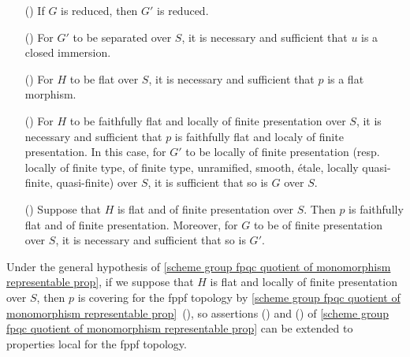 \begin{proposition}
\begin{enumerate}
    \item[(\rmnum{9})] If $G$ is reduced, then $G'$ is reduced.
    \item[(\rmnum{10})] For $G'$ to be separated over $S$, it is necessary and sufficient that $u$ is a closed immersion.
    \item[(\rmnum{11})] For $H$ to be flat over $S$, it is necessary and sufficient that $p$ is a flat morphism.
    \item[(\rmnum{12})] For $H$ to be faithfully flat and locally of finite presentation over $S$, it is necessary and sufficient that $p$ is faithfully flat and localy of finite presentation. In this case, for $G'$ to be locally of finite presentation (resp. locally of finite type, of finite type, unramified, smooth, \'etale, locally quasi-finite, quasi-finite) over $S$, it is sufficient that so is $G$ over $S$.
    \item[(\rmnum{13})] Suppose that $H$ is flat and of finite presentation over $S$. Then $p$ is faithfully flat and of finite presentation. Moreover, for $G$ to be of finite presentation over $S$, it is necessary and sufficient that so is $G'$.
\end{enumerate}
\end{proposition}

\begin{remark}
Under the general hypothesis of \cref{scheme group fpqc quotient of monomorphism representable prop}, if we suppose that $H$ is flat and locally of finite presentation over $S$, then $p$ is covering for the fppf topology by \cref{scheme group fpqc quotient of monomorphism representable prop}~(), so assertions () and () of \cref{scheme group fpqc quotient of monomorphism representable prop} can be extended to properties local for the fppf topology.
\end{remark}

